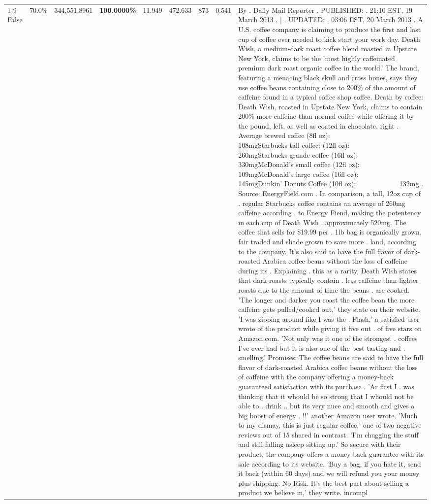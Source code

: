 \begin{table}[H]
{\begin{tabular}{lllrlllll}
\cline{1-9}
False & 70.0\% & 344,551.8961 & \bfseries \color{red} 100.0000\% & 11.949 & 472.633 & 873 & 0.541 & By . Daily Mail Reporter . PUBLISHED: . 21:10 EST, 19 March 2013 . | . UPDATED: . 03:06 EST, 20 March 2013 . A U.S. coffee company is claiming to produce the first and last cup of coffee ever needed to kick start your work day. Death Wish, a medium-dark roast coffee blend roasted in Upstate New York, claims to be the 'most highly caffeinated premium dark roast organic coffee in the world.' The brand, featuring a menacing black skull and cross bones, says they use coffee beans containing close to 200\% of the amount of caffeine found in a typical coffee shop coffee. Death by coffee: Death Wish, roasted in Upstate New York, claims to contain 200\% more caffeine than normal coffee while offering it by the pound, left, as well as coated in chocolate, right . Average brewed coffee (8fl oz):              108mgStarbucks tall coffee: (12fl oz):                260mgStarbucks grande coffee (16fl oz):         330mgMcDonald's small coffee (12fl oz):           109mgMcDonald's large coffee (16fl oz):           145mgDunkin' Donuts Coffee (10fl oz):             132mg . Source: EnergyField.com . In comparison, a tall, 12oz cup of . regular Starbucks coffee contains an average of 260mg caffeine according . to Energy Fiend, making the potentency in each cup of Death Wish . approximately 520mg. The coffee that sells for \$19.99 per . 1lb bag is organically grown, fair traded and shade grown to save more . land, according to the company. It's also said to have the full flavor of dark-roasted Arabica coffee beans without the loss of caffeine during its . Explaining . this as a rarity, Death Wish states that dark roasts typically contain . less caffeine than lighter roasts due to the amount of time the beans . are cooked. 'The longer and darker you roast the coffee bean the more caffeine gets pulled/cooked out,' they state on their website. 'I was zipping around like I was the . Flash,' a satisfied user wrote of the product while giving it five out . of five stars on Amazon.com. 'Not only was it one of the strongest . coffees I've ever had but it is also one of the best tasting and . smelling.’ Promises: The coffee beans are said to have the full flavor of dark-roasted Arabica coffee beans without the loss of caffeine with the company offering a money-back guaranteed satisfaction with its purchase . 'Ar first I . was thinking that it whould be so strong that I whould not be able to . drink .. but its very nuce and smooth and gives a big boost of energy . !!' another Amazon user wrote. 'Much to my dismay, this is just regular coffee,' one of two negative reviews out of 15 shared in contrast. 'I'm chugging the stuff and still falling asleep sitting up.' So secure with their product, the company offers a money-back guarantee with its sale according to its website. 'Buy a bag, if you hate it, send it back (within 60 days) and we will refund you your money plus shipping. No Risk. It’s the best part about selling a product we believe in,' they write. incompl \\

\end{tabular}}
\end{table}
